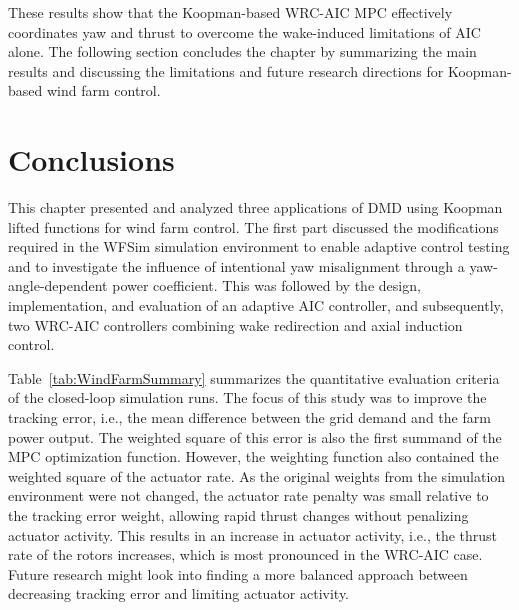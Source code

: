 %


These results show that the Koopman-based WRC-AIC MPC effectively coordinates yaw and thrust to overcome the wake-induced limitations of AIC alone. The following section concludes the chapter by summarizing the main results and discussing the limitations and future research directions for Koopman-based wind farm control.


\section{Conclusions}
This chapter presented and analyzed three applications of DMD using Koopman lifted functions
for wind farm control. The first part discussed the modifications required in the WFSim simulation
environment to enable adaptive control testing and to investigate the influence of intentional yaw
misalignment through a yaw-angle-dependent power coefficient. This was followed by the design,
implementation, and evaluation of an adaptive AIC controller, and subsequently, two WRC-AIC
controllers combining wake redirection and axial induction control.

Table~\ref{tab:WindFarmSummary} summarizes the quantitative evaluation criteria of the
closed-loop simulation runs. The focus of this study was to improve the tracking error, i.e., the
mean difference between the grid demand and the farm power output. The weighted square of
this error is also the first summand of the MPC optimization function. However, the weighting
function also contained the weighted square of the actuator rate. As the original weights from
the simulation environment were not changed, the actuator rate penalty was small relative to
the tracking error weight, allowing rapid thrust changes without penalizing actuator activity.
This results in an increase in actuator activity, i.e., the thrust rate of the rotors increases,
which is most pronounced in the WRC-AIC case. Future research might look into finding a
more balanced approach between decreasing tracking error and limiting actuator activity.


